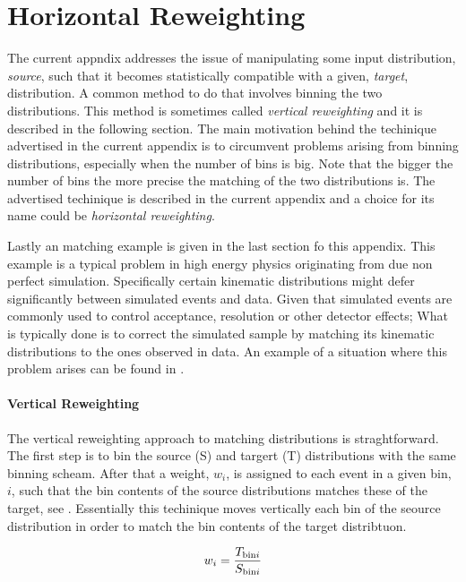 
\chapter{Horizontal Reweighting}
\label{AppendixB}

The current appndix addresses the issue of manipulating some input distribution, {\it source}, such that
it becomes statistically compatible with a given, {\it target}, distribution. A common method to do that
involves binning the two distributions. This method is sometimes called {\it vertical reweighting}
and it is described in the following section. The main motivation behind the techinique advertised in the current
appendix is to circumvent problems arising from binning distributions, especially when the number of
bins is big. Note that the bigger the number of bins the more precise the matching of the two distributions
is. The advertised techinique is described in the current appendix and a choice for its name could be {\it horizontal reweighting}.

Lastly an matching example is given in the last section fo this appendix. This example is a typical problem
in high energy physics originating from due non perfect simulation. Specifically certain kinematic
distributions might defer significantly between simulated events and data. Given that simulated
events are commonly used to control acceptance, resolution or other detector effects; What is typically
done is to correct the simulated sample by matching its kinematic distributions to the ones observed in data.
An example of a situation where this problem arises can be found in .

\subsubsection{Vertical Reweighting}
The vertical reweighting approach to matching distributions is straghtforward.
The first step is to bin the source (S) and targert (T) distributions with the same binning scheam.
After that a weight, $w_i$, is assigned to each event in a given bin, $i$, such that the bin
contents of the source distributions matches these of the target, see .
Essentially this techinique moves vertically each bin of the seource distribution in order to match
the bin contents of the target distribtuon.

\begin{equation}
  \centering
  w_i = \frac{T_{{\rm bin}i}}{S_{{\rm bin}i}}
\label{vert_rew}
\end{equation}

